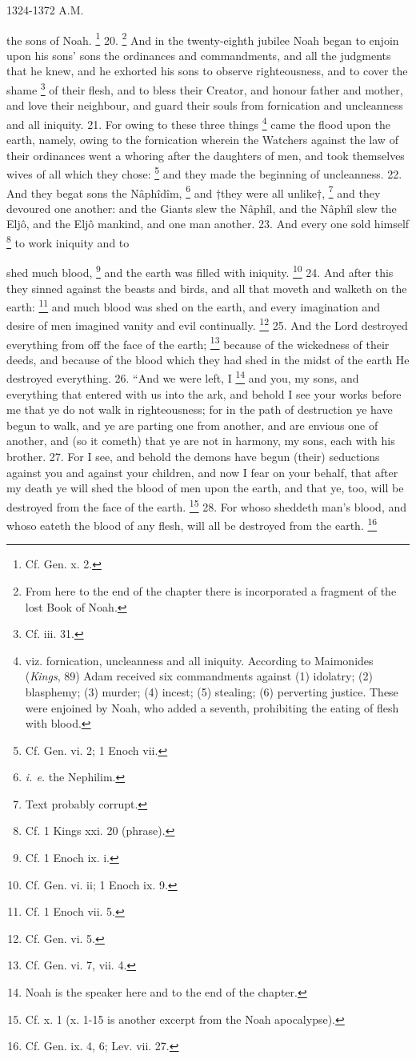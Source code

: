 1324-1372 A.M.

the sons of Noah. \footnote{Cf. Gen. x. 2.} 20. \footnote{From here to the end of the chapter there is incorporated a fragment of the lost Book of Noah.} And in the twenty-eighth jubilee Noah began to enjoin upon his sons' sons the ordinances and commandments, and all the judgments that he knew, and he exhorted his sons to observe righteousness, and to cover the shame \footnote{Cf. iii. 31.} of their flesh, and to bless their Creator, and honour father and mother, and love their neighbour, and guard their souls from fornication and uncleanness and all iniquity. 21. For owing to these three things \footnote{viz. fornication, uncleanness and all iniquity. According to Maimonides (\emph{Kings}, 89) Adam received six commandments against (1) idolatry; (2) blasphemy; (3) murder; (4) incest; (5) stealing; (6) perverting justice. These were enjoined by Noah, who added a seventh, prohibiting the eating of flesh with blood.} came the flood upon the earth, namely, owing to the fornication wherein the Watchers against the law of their ordinances went a whoring after the daughters of men, and took themselves wives of all which they chose: \footnote{Cf. Gen. vi. 2; 1 Enoch vii.} and they made the beginning of uncleanness. 22. And they begat sons the Nâphîdîm, \footnote{\emph{i. e.} the Nephilim.} and †they were all unlike†, \footnote{Text probably corrupt.} and they devoured one another: and the Giants slew the Nâphîl, and the Nâphîl slew the Eljô, and the Eljô mankind, and one man another. 23. And every one sold himself \footnote{Cf. 1 Kings xxi. 20 (phrase).} to work iniquity and to

shed much blood, \footnote{Cf. 1 Enoch ix. i.} and the earth was filled with iniquity. \footnote{Cf. Gen. vi. ii; 1 Enoch ix. 9.} 24. And after this they sinned against the beasts and birds, and all that moveth and walketh on the earth: \footnote{Cf. 1 Enoch vii. 5.} and much blood was shed on the earth, and every imagination and desire of men imagined vanity and evil continually. \footnote{Cf. Gen. vi. 5.} 25. And the Lord destroyed everything from off the face of the earth; \footnote{Cf. Gen. vi. 7, vii. 4.} because of the wickedness of their deeds, and because of the blood which they had shed in the midst of the earth He destroyed everything. 26. ``And we were left, I \footnote{Noah is the speaker here and to the end of the chapter.} and you, my sons, and everything that entered with us into the ark, and behold I see your works before me that ye do not walk in righteousness; for in the path of destruction ye have begun to walk, and ye are parting one from another, and are envious one of another, and (so it cometh) that ye are not in harmony, my sons, each with his brother. 27. For I see, and behold the demons have begun (their) seductions against you and against your children, and now I fear on your behalf, that after my death ye will shed the blood of men upon the earth, and that ye, too, will be destroyed from the face of the earth. \footnote{Cf. x. 1 (x. 1-15 is another excerpt from the Noah apocalypse).} 28. For whoso sheddeth man's blood, and whoso eateth the blood of any flesh, will all be destroyed from the earth. \footnote{Cf. Gen. ix. 4, 6; Lev. vii. 27.}

